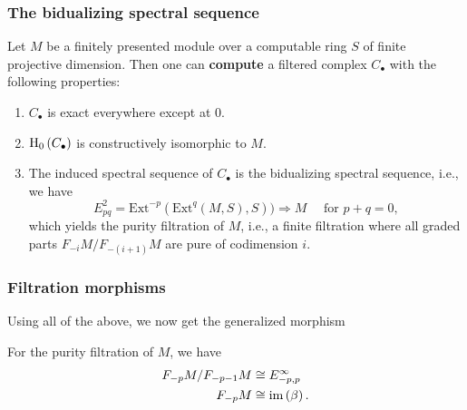 \begin{frame}
 \frametitle{The bidualizing spectral sequence}
 \begin{theorem}
  Let $M$ be a finitely presented module over a computable ring $S$ of finite projective dimension. \pause
  Then one can \textbf{compute} a filtered complex $C_\bullet$ with the following properties: \pause
  \begin{enumerate}
   \item $C_\bullet$ is exact everywhere except at $0$. \pause
   \item $\operatorname{H}_0 \left( C_\bullet \right)$ is constructively isomorphic to $M$. \pause
   \item The induced spectral sequence of $C_\bullet$ is the bidualizing spectral sequence, \pause i.e., we have
    \[
  E^2_{pq} = \mathrm{Ext}^{-p}( \mathrm{Ext}^q( M, S ), S ) )  \Longrightarrow
  M \quad \mbox{ for } p+q = 0,
  \] \pause
  which yields the purity filtration of $M$, \pause i.e., a finite filtration where
all graded parts $F_{-i}M / F_{-(i+1)}M$ are pure of codimension $i$.
  \end{enumerate}
 \end{theorem}
\end{frame}

\begin{frame}[fragile]
 \frametitle{Filtration morphisms}
 \begin{block}{}
  Using all of the above, we now get the generalized morphism \pause
  \begin{center}
  \end{center}
  \pause \pause \pause \pause \pause
  For the purity filtration of $M$, we have \pause
  \begin{align*}
   F_{-p} M/F_{-p-1}M  & \cong E_{-p,p}^\infty \\
   F_{-p}M & \cong \operatorname{im} \left( \beta \right).
  \end{align*}
 \end{block}
\end{frame}


